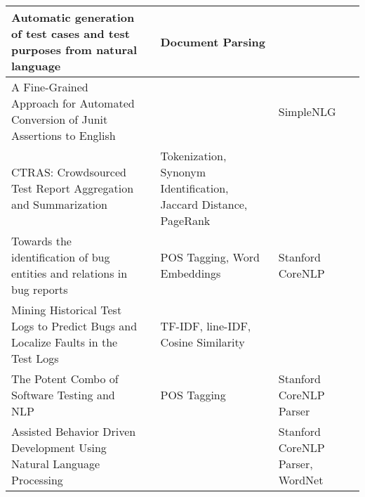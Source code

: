 \begin{longtable}{|p{4cm}|p{2.5cm}|p{4cm}|p{4cm}|}
            \hline Automatic generation of test cases and test purposes from natural language & \cite{nogueira2015automatic} & Document Parsing & \\
            \hline A Fine-Grained Approach for Automated Conversion of Junit Assertions to English  & \cite{10.1145/3283812.3283819} &   & SimpleNLG\\
            \hline CTRAS: Crowdsourced Test Report Aggregation and Summarization  & \cite{8811987} & Tokenization, Synonym Identification, Jaccard Distance, PageRank & \\
            \hline Towards the identification of bug entities and relations in bug reports & \cite{li2022towards} & POS Tagging, Word Embeddings & Stanford CoreNLP\\
            \hline Mining Historical Test Logs to Predict Bugs and Localize Faults in the Test Logs & \cite{8812113} & TF-IDF, line-IDF, Cosine Similarity & \\
            \hline The Potent Combo of Software Testing and NLP & \cite{mulla2020potent} & POS Tagging & Stanford CoreNLP Parser\\
            \hline Assisted Behavior Driven Development Using Natural Language Processing & \cite{soeken2012assisted} &  & Stanford CoreNLP Parser, WordNet\\
        \hline

\end{longtable}
